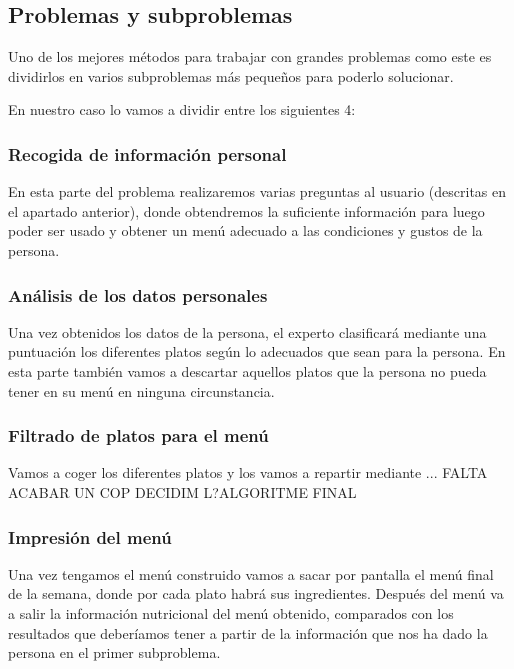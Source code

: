 \documentclass[12]{article}
\begin{document}
\subsection{Problemas y subproblemas}

Uno de los mejores métodos para trabajar con grandes problemas como este es dividirlos en varios subproblemas más pequeños para poderlo solucionar.

En nuestro caso lo vamos a dividir entre los siguientes 4:

\subsubsection{Recogida de información personal}

En esta parte del problema realizaremos varias preguntas al usuario (descritas en el apartado anterior), donde obtendremos la suficiente información para luego poder ser usado y obtener un menú adecuado a las condiciones y gustos de la persona.

\subsubsection{Análisis de los datos personales}

Una vez obtenidos los datos de la persona, el experto clasificará mediante una puntuación los diferentes platos según lo adecuados que sean para la persona. En esta parte también vamos a descartar aquellos platos que la persona no pueda tener en su menú en ninguna circunstancia.

\subsubsection{Filtrado de platos para el menú}

Vamos a coger los diferentes platos y los vamos a repartir mediante ... FALTA ACABAR UN COP DECIDIM L?ALGORITME FINAL

\subsubsection{Impresión del menú}

Una vez tengamos el menú construido vamos a sacar por pantalla el menú final de la semana, donde por cada plato habrá sus ingredientes.
Después del menú va a salir la información nutricional del menú obtenido, comparados con los resultados que deberíamos tener a partir de la información que nos ha dado la persona en el primer subproblema.
\end{document}
